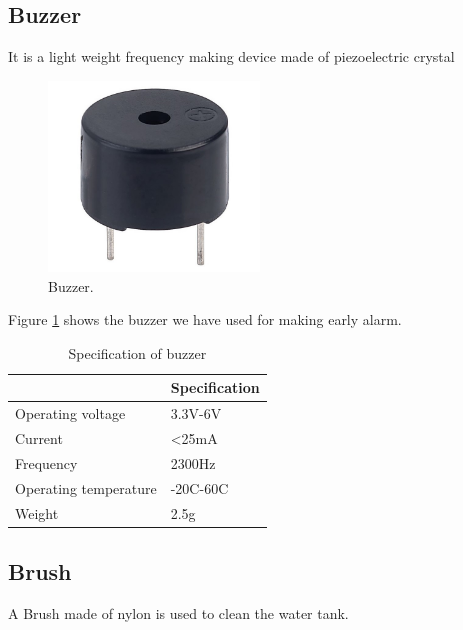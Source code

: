 \subsection{Buzzer}
It is a light weight frequency making device made of piezoelectric crystal
\begin{figure}[h]
\centering
\includegraphics[width=0.5\textwidth]{figures/buzzer.jpg}
\caption{Buzzer.}
\label{Buzzer1}
\end{figure}
Figure \ref{Buzzer1} shows the buzzer we have used for making early alarm.

\begin{table}[H]
\centering
\caption{Specification of buzzer}
\begin{tabular}{|l|l|}
\hline
\multicolumn{1}{|c|}{\cellcolor[HTML]{FFFFFF}{\color[HTML]{333333} \textbf{Characteristics}}} & \textbf{Specification} \\ \hline
Operating voltage                                                                             & 3.3V-6V                \\ \hline
Current                                                                                       & \textless{}25mA        \\ \hline
Frequency                                                                                     & 2300Hz                 \\ \hline
Operating temperature                                                                         & -20C-60C               \\ \hline
Weight                                                                                        & 2.5g                   \\ \hline
\end{tabular}
\end{table}
\subsection{Brush}
A Brush made of nylon is used to clean the water tank.

